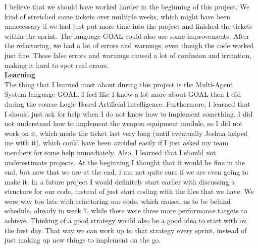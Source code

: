 I believe that we should have worked harder in the beginning of this project. We kind of stretched some tickets over multiple weeks, which might have been unnecessary if we had just put more time into the project and finished the tickets within the sprint.
The language GOAL could also use some improvements. After the refactoring, we had a lot of errors and warnings, even though the code worked just fine. These false errors and warnings caused a lot of confusion and irritation, making it hard to spot real errors.
\\[2mm]\noindent
\textbf{Learning}\\
The thing that I learned most about during this project is the Multi-Agent System language GOAL. I feel like I know a lot more about GOAL then I did during the course Logic Based Artificial Intelligence.
Furthermore, I learned that I should just ask for help when I do not know how to implement something. I did not understand how to implement the weapon equipment module, so I did not work on it, which made the ticket last very long (until eventually Joshua helped me with it), which could have been avoided easily if I just asked my team members for some help immediately. 
Also, I learned that I should not underestimate projects. At the beginning I thought that it would be fine in the end, but now that we are at the end, I am not quite sure if we are even going to make it.
In a future project I would definitely start earlier with discussing a structure for our code, instead of just start coding with the files that we have. We were way too late with refactoring our code, which caused us to be behind schedule, already in week 7, while there were three more performance targets to achieve. Thinking of a good strategy would also be a good idea to start with on the first day. That way we can work up to that strategy every sprint, instead of just making up new things to implement on the go.

